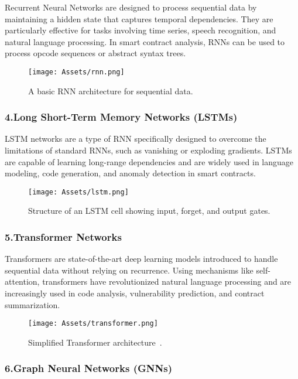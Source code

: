 Recurrent Neural Networks are designed to process sequential data by maintaining a hidden state that captures temporal dependencies. They are particularly effective for tasks involving time series, speech recognition, and natural language processing. In smart contract analysis, RNNs can be used to process opcode sequences or abstract syntax trees.

\begin{figure}[H]
    \centering
    \texttt{[image: Assets/rnn.png]}
    \caption{A basic RNN architecture for sequential data.}
    \label{fig:rnn}
\end{figure}

\subsubsection*{4.Long Short-Term Memory Networks (LSTMs)}

LSTM networks are a type of RNN specifically designed to overcome the limitations of standard RNNs, such as vanishing or exploding gradients. LSTMs are capable of learning long-range dependencies and are widely used in language modeling, code generation, and anomaly detection in smart contracts.

\begin{figure}[H]
    \centering
    \texttt{[image: Assets/lstm.png]}
    \caption{Structure of an LSTM cell showing input, forget, and output gates.}
    \label{fig:lstm}
\end{figure}

\subsubsection*{5.Transformer Networks}

Transformers are state-of-the-art deep learning models introduced to handle sequential data without relying on recurrence. Using mechanisms like self-attention, transformers have revolutionized natural language processing and are increasingly used in code analysis, vulnerability prediction, and contract summarization.

\begin{figure}[H]
    \centering
    \texttt{[image: Assets/transformer.png]}
    \caption{Simplified Transformer architecture~\cite{amanatulla2023transformer}.}
    \label{fig:transformer}
\end{figure}

\subsubsection*{6.Graph Neural Networks (GNNs)}

